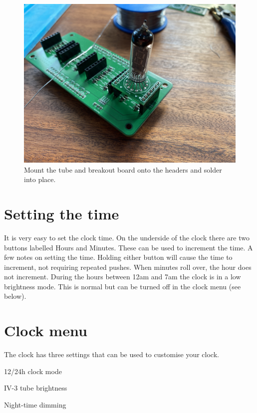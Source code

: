 \documentclass[12pt]{article}
\begin{document}
\begin{figure}[t]
\includegraphics[scale=0.05]{IMG_1113}
\centering
\caption{Mount the tube and breakout board onto the headers and solder into place.}
\end{figure}

\FloatBarrier
\section{Setting the time}
It is very easy to set the clock time. On the underside of the clock there are two buttons labelled Hours and Minutes. These can be used to increment the time. A few notes on setting the time. Holding either button will cause the time to increment, not requiring repeated pushes. When minutes roll over, the hour does not increment. During the hours between 12am and 7am the clock is in a low brightness mode. This is normal but can be turned off in the clock menu (see below). 

\section{Clock menu}
The clock has three settings that can be used to customise your clock.

\begin{description}[font=$\bullet$~\normalfont\scshape]
\item [] 12/24h clock mode
\item [] IV-3 tube brightness
\item [] Night-time dimming
\end{description}
\end{document}
